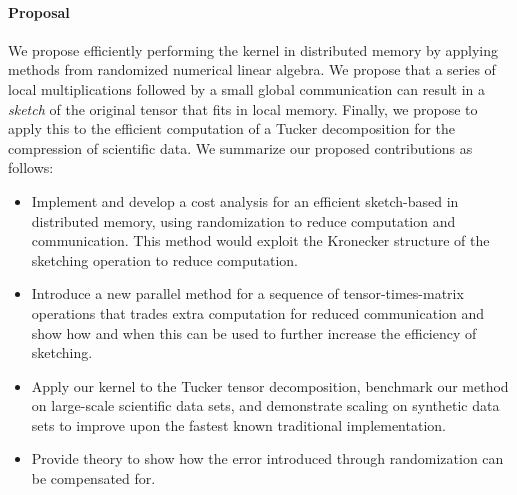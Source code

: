 \paragraph{Proposal}
We propose efficiently performing the \MTFSBC kernel in distributed memory by applying methods 
from randomized numerical linear algebra. We propose that a series of local multiplications followed by a small 
global communication can result in a \emph{sketch} of the original tensor that fits in local memory. 
Finally, we propose to apply this to the efficient computation of a Tucker decomposition for the compression of scientific data.
We summarize our proposed contributions as follows:
\begin{itemize}
  \item Implement and develop a cost analysis for an efficient sketch-based \MTFSBC in 
  distributed memory, using randomization to reduce computation and communication. This method would exploit the Kronecker structure of the sketching operation to reduce computation.
  \item Introduce a new parallel method for a sequence of tensor-times-matrix operations that trades extra computation for reduced communication and show how and when this can be used to further increase the efficiency of sketching. 
  \item Apply our kernel to the Tucker tensor decomposition, benchmark our method on large-scale scientific 
  data sets, and demonstrate scaling on synthetic data sets to improve upon the fastest known 
  traditional implementation.
  \item Provide theory to show how the error introduced through randomization can be compensated for.
\end{itemize}

